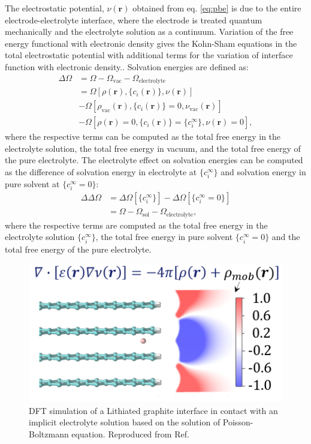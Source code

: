 \documentclass[journal=jacsat,manuscript=article]{achemso}
\newcommand{\bvec}[1]{\mathbf{#1}}
\newcommand*{\rvec}{\bvec{r}}
\newcommand*{\ofrvec}{\!\left(\rvec\right)}
\newcommand*{\dens}{\rho}
\newcommand*{\ci}{c_i}
\newcommand*{\cif}{c_i^{\infty}}
\newcommand*{\pot}{\nu}
\begin{document}
The electrostatic potential, $\pot\ofrvec$ obtained from eq. \eqref{eq:pbe} is due to the entire electrode-electrolyte interface, where the electrode is treated quantum mechanically and the electrolyte solution as a continuum. Variation of the free energy functional with electronic density gives the Kohn-Sham equations in the total electrostatic potential with additional terms for the variation of interface function with electronic density.\cite{Dziedzic2011, Ringe2016}. Solvation energies are defined as:\cite{Ringe2016, Stein2019}
\begin{align}
    \Delta\Omega &=\Omega-\Omega_{\textrm{vac}}-\Omega_{\textrm{electrolyte}} \\
    &=\Omega\left[\dens\ofrvec,\{\ci\ofrvec\},\pot\ofrvec\right] \\
    \nonumber
    &-\Omega\left[\dens_{\textrm{vac}}\ofrvec,\{\ci\ofrvec\}=0,\pot_{\textrm{vac}}\ofrvec\right] \\
    \nonumber
    &-\Omega\left[\dens\ofrvec=0,\{\ci\ofrvec\}=\{\cif\},\pot\ofrvec=0\right]
    \nonumber,
\end{align}
where the respective terms can be computed as the total free energy in the electrolyte solution, the total free energy in vacuum, and the total free energy of the pure electrolyte.\cite{Dziedzic2020} The electrolyte effect on solvation energies can be computed as the difference of solvation energy in electrolyte at $\{\cif\}$ and solvation energy in pure solvent at $\{\cif=0\}$:
\begin{align}
\Delta\Delta\Omega    &= \Delta\Omega\left[{\{\cif\}}\right]-\Delta\Omega\left[{\{\cif=0\}}\right] \\
&= \Omega - \Omega_{\textrm{sol}} - \Omega_{\textrm{electrolyte}},
\end{align}
where the respective terms are computed as the total free energy in the electrolyte solution $\{\cif\}$, the total free energy in pure solvent $\{\cif=0\}$ and the total free energy of the pure electrolyte. 


\begin{figure}
    \centering
    \includegraphics[scale=0.7]{figures/DFT+Continuum.png}
    \caption{DFT simulation of a Lithiated graphite interface in contact with an implicit electrolyte solution based on the solution of Poisson-Boltzmann equation. Reproduced from Ref. }
    \label{fig:DFT+continuum}
\end{figure}
\end{document}

